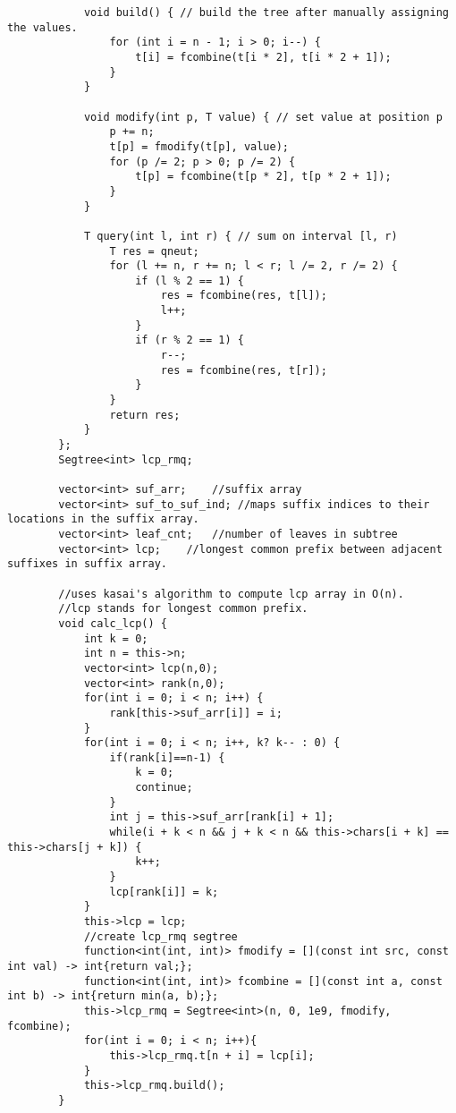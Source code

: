\documentclass[8pt, headheight=10pt]{scrartcl}
\begin{document}
\begin{multicols*}{3}
\begin{lstlisting}
            void build() { // build the tree after manually assigning the values.
                for (int i = n - 1; i > 0; i--) {   
                    t[i] = fcombine(t[i * 2], t[i * 2 + 1]);
                }
            }

            void modify(int p, T value) { // set value at position p
                p += n;
                t[p] = fmodify(t[p], value);
                for (p /= 2; p > 0; p /= 2) {
                    t[p] = fcombine(t[p * 2], t[p * 2 + 1]);
                }
            }

            T query(int l, int r) { // sum on interval [l, r)
                T res = qneut;
                for (l += n, r += n; l < r; l /= 2, r /= 2) {
                    if (l % 2 == 1) {
                        res = fcombine(res, t[l]);
                        l++;
                    }
                    if (r % 2 == 1) {
                        r--;
                        res = fcombine(res, t[r]);
                    }
                }
                return res;
            }
        };
        Segtree<int> lcp_rmq;

        vector<int> suf_arr;    //suffix array
        vector<int> suf_to_suf_ind; //maps suffix indices to their locations in the suffix array. 
        vector<int> leaf_cnt;   //number of leaves in subtree
        vector<int> lcp;    //longest common prefix between adjacent suffixes in suffix array. 

        //uses kasai's algorithm to compute lcp array in O(n). 
        //lcp stands for longest common prefix.
        void calc_lcp() {
            int k = 0;
            int n = this->n;
            vector<int> lcp(n,0);
            vector<int> rank(n,0);
            for(int i = 0; i < n; i++) {
                rank[this->suf_arr[i]] = i;
            }
            for(int i = 0; i < n; i++, k? k-- : 0) {
                if(rank[i]==n-1) {
                    k = 0; 
                    continue;
                }
                int j = this->suf_arr[rank[i] + 1];
                while(i + k < n && j + k < n && this->chars[i + k] == this->chars[j + k]) {
                    k++;
                }
                lcp[rank[i]] = k;
            }
            this->lcp = lcp;
            //create lcp_rmq segtree
            function<int(int, int)> fmodify = [](const int src, const int val) -> int{return val;};
            function<int(int, int)> fcombine = [](const int a, const int b) -> int{return min(a, b);};
            this->lcp_rmq = Segtree<int>(n, 0, 1e9, fmodify, fcombine);
            for(int i = 0; i < n; i++){
                this->lcp_rmq.t[n + i] = lcp[i];
            }
            this->lcp_rmq.build();
        }


\end{lstlisting}
\end{multicols*}
\end{document}
